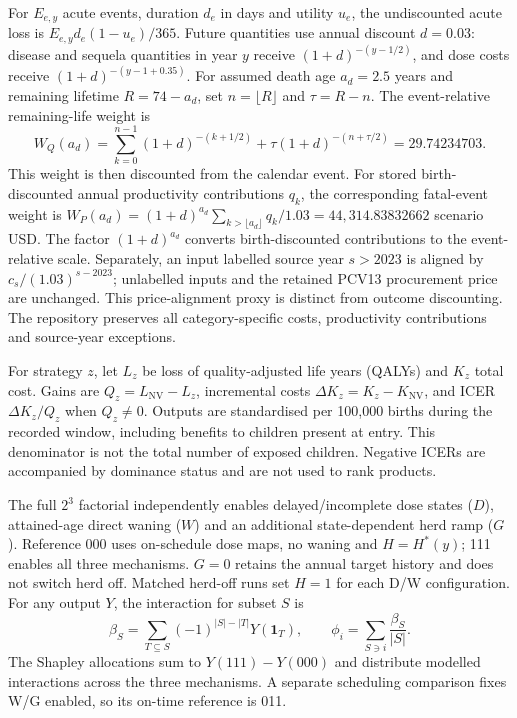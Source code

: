 \documentclass[10pt,letterpaper]{article}
\newcommand{\NV}{\mathrm{NV}}
\begin{document}
For $E_{e,y}$ acute events, duration $d_e$ in days and utility $u_e$, the undiscounted acute loss is $E_{e,y}d_e(1-u_e)/365$. Future quantities use annual discount $d=0.03$: disease and sequela quantities in year $y$ receive $(1+d)^{-(y-1/2)}$, and dose costs receive $(1+d)^{-(y-1+0.35)}$. For assumed death age $a_d=2.5$ years and remaining lifetime $R=74-a_d$, set $n=\lfloor R\rfloor$ and $\tau=R-n$. The event-relative remaining-life weight is
\begin{equation}
 W_Q(a_d)=\sum_{k=0}^{n-1}(1+d)^{-(k+1/2)}
       +\tau(1+d)^{-(n+\tau/2)}=29.74234703.
 \label{eq:event_life_weight}
\end{equation}
This weight is then discounted from the calendar event. For stored birth-discounted annual productivity contributions $q_k$, the corresponding fatal-event weight is $W_P(a_d)=(1+d)^{a_d}\sum_{k>\lfloor a_d\rfloor}q_k/1.03=44{,}314.83832662$ scenario USD. The factor $(1+d)^{a_d}$ converts birth-discounted contributions to the event-relative scale. Separately, an input labelled source year $s>2023$ is aligned by $c_s/(1.03)^{s-2023}$; unlabelled inputs and the retained PCV13 procurement price are unchanged. This price-alignment proxy is distinct from outcome discounting. The repository preserves all category-specific costs, productivity contributions and source-year exceptions.

For strategy $z$, let $L_z$ be loss of quality-adjusted life years (QALYs) and $K_z$ total cost. Gains are $Q_z=L_\NV-L_z$, incremental costs $\Delta K_z=K_z-K_\NV$, and ICER $\Delta K_z/Q_z$ when $Q_z\ne0$. Outputs are standardised per 100,000 births during the recorded window, including benefits to children present at entry. This denominator is not the total number of exposed children. Negative ICERs are accompanied by dominance status and are not used to rank products.

The full $2^3$ factorial independently enables delayed/incomplete dose states ($D$), attained-age direct waning ($W$) and an additional state-dependent herd ramp ($G$). Reference 000 uses on-schedule dose maps, no waning and $H=H^*(y)$; 111 enables all three mechanisms. $G=0$ retains the annual target history and does not switch herd off. Matched herd-off runs set $H=1$ for each D/W configuration. For any output $Y$, the interaction for subset $S$ is
\begin{equation}
 \beta_S=\sum_{T\subseteq S}(-1)^{|S|-|T|}Y(\mathbf1_T),
 \qquad\phi_i=\sum_{S\ni i}\frac{\beta_S}{|S|}.
 \label{eq:factorial}
\end{equation}
The Shapley allocations sum to $Y(111)-Y(000)$ and distribute modelled interactions across the three mechanisms. A separate scheduling comparison fixes W/G enabled, so its on-time reference is 011.
\end{document}
